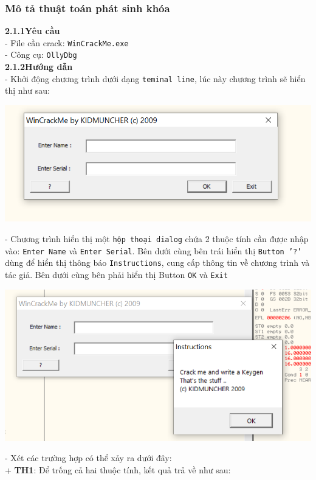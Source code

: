 \subsubsection{Mô tả thuật toán phát sinh khóa}
\noindent\textbf{2.1.1\quad Yêu cầu}\\
- File cần crack: \texttt{WinCrackMe.exe}\\
- Công cụ: \texttt{OllyDbg}\\
\noindent\textbf{2.1.2\quad Hướng dẫn}\\
- Khởi động chương trình dưới dạng \texttt{teminal line}, lúc này chương trình sẽ hiển thị như sau:
\begin{center}
    \includegraphics[width=\textwidth]{img/file-2/demo1.PNG}
\end{center}
- Chương trình hiển thị một  \texttt{hộp thoại dialog} chứa 2 thuộc tính cần được nhập vào: \texttt{Enter Name} và \texttt{Enter Serial}. Bên dưới cùng bên trái hiển thị \texttt{Button '?'} dùng để hiển thị thông báo \texttt{Instructions}, cung cấp thông tin về chương trình và tác giả. Bên dưới cùng bên phải hiển thị Button \texttt{OK} và \texttt{Exit}\\
\begin{center}
    \includegraphics[width=\textwidth]{img/file-2/demo2.PNG}
\end{center}
- Xét các trường hợp có thể xảy ra dưới đây:\\
+ \textbf{TH1}: Để trống cả hai thuộc tính, kết quả trả về như sau:
